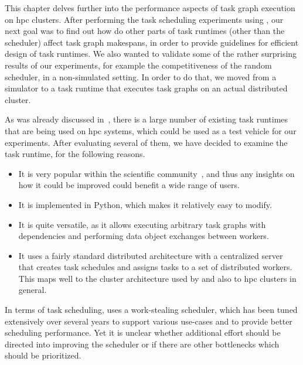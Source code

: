 This chapter delves further into the performance aspects of task graph execution on
\gls{hpc} clusters. After performing the task scheduling experiments using
\estee{}, our next goal was to find out how do other parts of task runtimes
(other than the scheduler) affect task graph makespans, in order to provide guidelines for
efficient design of task runtimes. We also wanted to validate some of the rather surprising results
of our experiments, for example the competitiveness of the random scheduler, in a non-simulated
setting. In order to do that, we moved from a simulator to a task runtime that executes task graphs
on an actual distributed cluster.

As was already discussed in~, there is a large number of existing task
runtimes that are being used on \gls{hpc} systems, which could be used as a test
vehicle for our experiments. After evaluating several of them, we have decided to examine the
\dask{}~\cite{dask} task runtime, for the following reasons.
\begin{itemize}
	\setlength\itemsep{0.1em}
	\item It is very popular within the scientific community~\cite{dask-user-survey}, and thus any insights
	      on how it could be improved could benefit a wide range of users.
	\item It is implemented in Python, which makes it relatively easy to modify.
	\item It is quite versatile, as it allows executing arbitrary task graphs with dependencies and
	      performing data object exchanges between workers.
	\item It uses a fairly standard distributed architecture with a centralized server that creates task
	      schedules and assigns tasks to a set of distributed workers. This maps well to the cluster
	      architecture used by \estee{} and also to \gls{hpc} clusters in
	      general.
\end{itemize}

In terms of task scheduling, \dask{} uses a work-stealing scheduler, which has
been tuned extensively over several years to support various use-cases and to provide better
scheduling performance. Yet it is unclear whether additional effort should be directed into
improving the scheduler or if there are other bottlenecks which should be prioritized.

